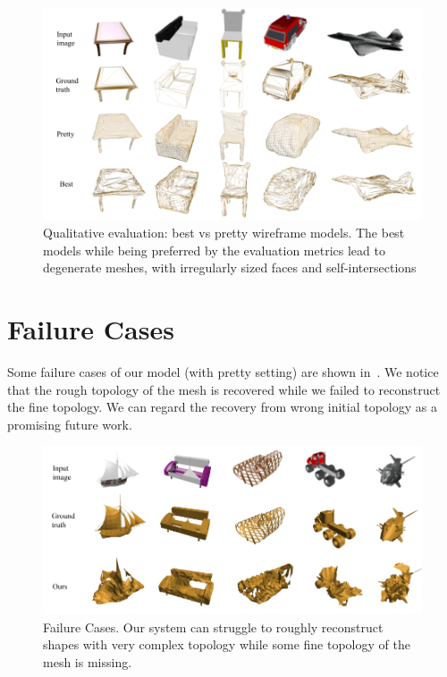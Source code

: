\begin{figure}[h]
    \begin{center}
        \includegraphics[width=\linewidth]{imgs/best_vs_pretty.png}
    \end{center}
    \vspace{-4mm}
        \caption{Qualitative evaluation: best vs pretty wireframe models. The best models while being preferred by the evaluation metrics lead to degenerate meshes, with irregularly sized faces and self-intersections}
        \vspace{-4mm}
        \label{fig:best_vs_pretty}
\end{figure}

\newpage
\section{Failure Cases}

Some failure cases of our model (with pretty setting) are shown in~.
We notice that the rough topology of the mesh is recovered while we failed to reconstruct the fine topology.
We can regard the recovery from wrong initial topology as a promising future work.

\begin{figure}[h!]
    \begin{center}
        \includegraphics[width=\linewidth]{imgs/failure_cases.png}
    \end{center}
    \vspace{-4mm}
        \caption{Failure Cases. Our system can struggle to roughly reconstruct shapes with very complex topology while some fine topology of the mesh is missing.}
        \vspace{-4mm}
        \label{fig:failure_cases}
\end{figure}
